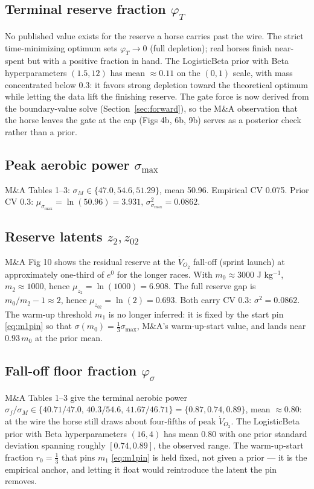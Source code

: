 \documentclass[11pt]{article}
\begin{document}
\subsection*{Terminal reserve fraction $\varphi_T$}
No published value exists for the reserve a horse carries past the wire. The strict time-minimizing optimum sets $\varphi_T \to 0$ (full depletion); real horses finish near-spent but with a positive fraction in hand. The LogisticBeta prior with Beta hyperparameters $(1.5, 12)$ has mean $\approx 0.11$ on the $(0, 1)$ scale, with mass concentrated below $0.3$: it favors strong depletion toward the theoretical optimum while letting the data lift the finishing reserve. The gate force is now derived from the boundary-value solve (Section~\ref{sec:forward}), so the M\&A observation that the horse leaves the gate at the cap (Figs 4b, 6b, 9b) serves as a posterior check rather than a prior.

\subsection*{Peak aerobic power $\sigma_{\max}$}
M\&A Tables 1–3: $\sigma_M \in \{47.0, 54.6, 51.29\}$, mean 50.96. Empirical CV 0.075. Prior CV 0.3: $\mu_{\sigma_{\max}} = \ln(50.96) = 3.931$, $\sigma_{\sigma_{\max}}^2 = 0.0862$.

\subsection*{Reserve latents $z_2, z_{02}$}
M\&A Fig 10 shows the residual reserve at the $\dot V_{O_2}$ fall-off (sprint launch) at approximately one-third of $e^0$ for the longer races. With $m_0 \approx 3000$ J kg$^{-1}$, $m_2 \approx 1000$, hence $\mu_{z_2} = \ln(1000) = 6.908$. The full reserve gap is $m_0/m_2 - 1 \approx 2$, hence $\mu_{z_{02}} = \ln(2) = 0.693$. Both carry CV 0.3: $\sigma^2 = 0.0862$. The warm-up threshold $m_1$ is no longer inferred: it is fixed by the start pin \eqref{eq:m1pin} so that $\sigma(m_0) = \tfrac13\sigma_{\max}$, M\&A's warm-up-start value, and lands near $0.93\,m_0$ at the prior mean.

\subsection*{Fall-off floor fraction $\varphi_\sigma$}
M\&A Tables 1--3 give the terminal aerobic power $\sigma_f/\sigma_M \in \{40.71/47.0,\, 40.3/54.6,\, 41.67/46.71\} = \{0.87, 0.74, 0.89\}$, mean $\approx 0.80$: at the wire the horse still draws about four-fifths of peak $\dot V_{O_2}$. The LogisticBeta prior with Beta hyperparameters $(16, 4)$ has mean 0.80 with one prior standard deviation spanning roughly $[0.74, 0.89]$, the observed range. The warm-up-start fraction $r_0 = \tfrac13$ that pins $m_1$ \eqref{eq:m1pin} is held fixed, not given a prior --- it is the empirical anchor, and letting it float would reintroduce the latent the pin removes.
\end{document}
